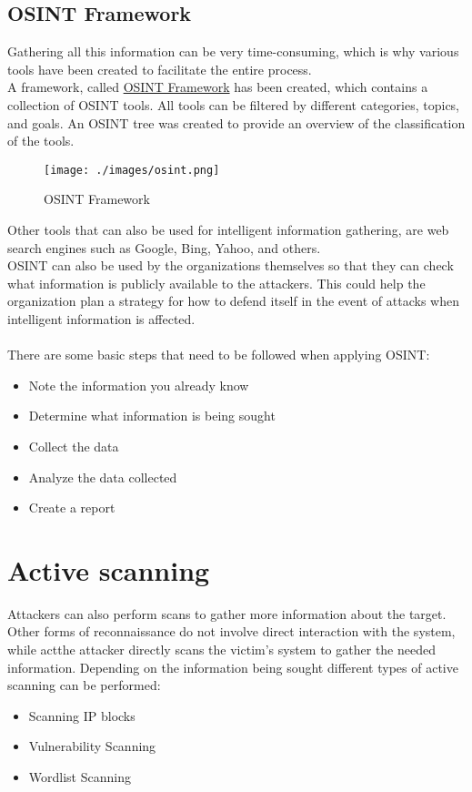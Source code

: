 \subsection{OSINT Framework}
Gathering all this information can be very time-consuming, which is why various tools have been created to facilitate the entire process. \\
A framework, called \href{https://osintframework.com}{OSINT Framework} has been created, which contains a collection of OSINT tools.
All tools can be filtered by different categories, topics, and goals. An OSINT tree was created to provide an overview of the classification of the tools.
\begin{figure}[H]
    \centering
    \texttt{[image: ./images/osint.png]}
    \caption{OSINT Framework}
    \label{fig:osint}
\end{figure}

Other tools that can also be used for intelligent information gathering, are web search engines such as Google, Bing, Yahoo, and others. \\
OSINT can also be used by the organizations themselves so that they can check what information is publicly available to the attackers. This could help the organization plan a strategy for how to defend itself in the event of attacks when intelligent information is affected.\\
\\There are some basic steps that need to be followed when applying OSINT:
\begin{itemize}
    \item Note the information you already know
    \item Determine what information is being sought
    \item Collect the data
    \item Analyze the data collected
    \item Create a report
\end{itemize}

\newpage
\section{Active scanning}
Attackers can also perform scans to gather more information about the target.
 Other forms of reconnaissance do not involve direct interaction with the system, while actthe attacker directly scans the victim's system to gather the needed information.
 Depending on the information being sought different types of active scanning can be performed:
 \begin{itemize}
     \item Scanning IP blocks
     \item Vulnerability Scanning
     \item Wordlist Scanning
 \end{itemize}

